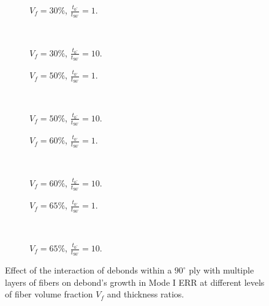 \documentclass[review]{elsarticle}
\begin{document}
\begin{figure}[!h]
\centering
    \begin{subfigure}[b]{0.45\textwidth}
        \caption{$V_{f}=30\%$, $\frac{t_{0^{\circ}}}{t_{90^{\circ}}}=1$.}\label{subfig:sideabovefiber30MIthick1}
    \end{subfigure} ~
    \begin{subfigure}[b]{0.45\textwidth}
         \caption{$V_{f}=30\%$, $\frac{t_{0^{\circ}}}{t_{90^{\circ}}}=10$.}\label{subfig:sideabovefiber30MIthick10}
    \end{subfigure}

   \begin{subfigure}[b]{0.45\textwidth}
        \caption{$V_{f}=50\%$, $\frac{t_{0^{\circ}}}{t_{90^{\circ}}}=1$.}\label{subfig:sideabovefiber50MIthick1}
    \end{subfigure} ~
    \begin{subfigure}[b]{0.45\textwidth}
         \caption{$V_{f}=50\%$, $\frac{t_{0^{\circ}}}{t_{90^{\circ}}}=10$.}\label{subfig:sideabovefiber50MIthick10}
    \end{subfigure}

    \begin{subfigure}[b]{0.45\textwidth}
        \caption{$V_{f}=60\%$, $\frac{t_{0^{\circ}}}{t_{90^{\circ}}}=1$.}\label{subfig:sideabovefiber60MIthick1}
    \end{subfigure} ~
    \begin{subfigure}[b]{0.45\textwidth}
        \caption{$V_{f}=60\%$, $\frac{t_{0^{\circ}}}{t_{90^{\circ}}}=10$.}\label{subfig:sideabovefiber60MIthick10}
    \end{subfigure}

    \begin{subfigure}[b]{0.45\textwidth}
        \caption{$V_{f}=65\%$, $\frac{t_{0^{\circ}}}{t_{90^{\circ}}}=1$.}\label{subfig:sideabovefiber65MIthick1}
    \end{subfigure} ~
    \begin{subfigure}[b]{0.45\textwidth}
        \caption{$V_{f}=65\%$, $\frac{t_{0^{\circ}}}{t_{90^{\circ}}}=10$.}\label{subfig:sideabovefiber65MIthick10}
    \end{subfigure}

\caption{Effect of the interaction of debonds within a $90^{\circ}$ ply with multiple layers of fibers on debond's growth in Mode I ERR at different levels of fiber volume fraction $V_{f}$ and thickness ratios.}\label{fig:sideabovefibersMI}
\end{figure}
\end{document}
